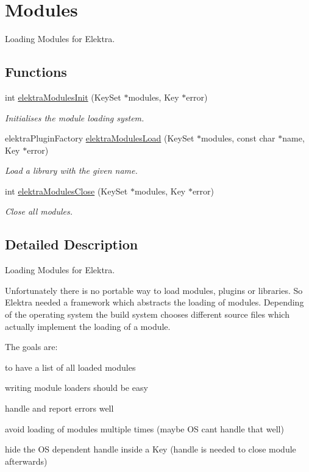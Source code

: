 \hypertarget{group__modules}{}\section{Modules}
\label{group__modules}


Loading Modules for Elektra.  


\subsection*{Functions}
\begin{DoxyCompactItemize}
\item 
int \mbox{\hyperlink{group__modules_gaa40915e67f973ccd5258aa450bd03585}{elektra\+Modules\+Init}} (Key\+Set $\ast$modules, Key $\ast$error)
\begin{DoxyCompactList}\small\item\em Initialises the module loading system. \end{DoxyCompactList}\item 
elektra\+Plugin\+Factory \mbox{\hyperlink{group__modules_ga09300fbf0e0cfc9dc80bb877b00117c0}{elektra\+Modules\+Load}} (Key\+Set $\ast$modules, const char $\ast$name, Key $\ast$error)
\begin{DoxyCompactList}\small\item\em Load a library with the given name. \end{DoxyCompactList}\item 
int \mbox{\hyperlink{group__modules_ga5646d92ffe3e1e04c4586d9c910ba6bd}{elektra\+Modules\+Close}} (Key\+Set $\ast$modules, Key $\ast$error)
\begin{DoxyCompactList}\small\item\em Close all modules. \end{DoxyCompactList}\end{DoxyCompactItemize}


\subsection{Detailed Description}
Loading Modules for Elektra. 

Unfortunately there is no portable way to load modules, plugins or libraries. So Elektra needed a framework which abstracts the loading of modules. Depending of the operating system the build system chooses different source files which actually implement the loading of a module.

The goals are\+:
\begin{DoxyItemize}
\item to have a list of all loaded modules
\item writing module loaders should be easy
\item handle and report errors well
\item avoid loading of modules multiple times (maybe OS can\textquotesingle{}t handle that well)
\item hide the OS dependent handle inside a Key (handle is needed to close module afterwards) 
\end{DoxyItemize}

